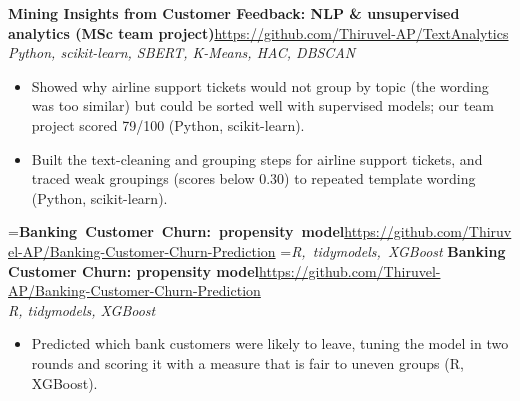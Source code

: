 \documentclass[a4paper,11pt]{article}
\newcommand{\project}[3]{%
  \textbf{#1}\hfill#3\\ {\color{muted}\small\textit{#2}}\par}
\newcommand{\gap}{\vspace{5pt}}
\begin{document}
\ifdim\wd0>\linewidth
\ifdim\wd2>\linewidth
\textbf{Mining Insights from Customer Feedback: NLP \& unsupervised analytics (MSc team project)}\\ {\color{muted}\small\textit{Python, scikit-learn, SBERT, K-Means, HAC, DBSCAN}}\\ \hspace*{\fill}{\small\url{https://github.com/Thiruvel-AP/TextAnalytics}}\par
\else
\textbf{Mining Insights from Customer Feedback: NLP \& unsupervised analytics (MSc team project)}\\ {\color{muted}\small\textit{Python, scikit-learn, SBERT, K-Means, HAC, DBSCAN}}\hfill{\small\url{https://github.com/Thiruvel-AP/TextAnalytics}}\par
\fi
\else
\project{Mining Insights from Customer Feedback: NLP \& unsupervised analytics (MSc team project)}{Python, scikit-learn, SBERT, K-Means, HAC, DBSCAN}{\url{https://github.com/Thiruvel-AP/TextAnalytics}}
\fi
\begin{itemize}
  \item Showed why airline support tickets would not group by topic (the wording was too similar) but could be sorted well with supervised models; our team project scored 79/100 (Python, scikit-learn).
  \item Built the text-cleaning and grouping steps for airline support tickets, and traced weak groupings (scores below 0.30) to repeated template wording (Python, scikit-learn).
\end{itemize}
\gap
{}
=\hbox{\textbf{Banking Customer Churn: propensity model}\hspace{1em}\url{https://github.com/Thiruvel-AP/Banking-Customer-Churn-Prediction}}%
=\hbox{{\small\textit{R, tidymodels, XGBoost}}}%
\ifdim\wd0>\linewidth
\ifdim\wd2>\linewidth
\textbf{Banking Customer Churn: propensity model}\\ {\color{muted}\small\textit{R, tidymodels, XGBoost}}\\ \hspace*{\fill}{\small\url{https://github.com/Thiruvel-AP/Banking-Customer-Churn-Prediction}}\par
\else
\textbf{Banking Customer Churn: propensity model}\\ {\color{muted}\small\textit{R, tidymodels, XGBoost}}\hfill{\small\url{https://github.com/Thiruvel-AP/Banking-Customer-Churn-Prediction}}\par
\fi
\else
\project{Banking Customer Churn: propensity model}{R, tidymodels, XGBoost}{\url{https://github.com/Thiruvel-AP/Banking-Customer-Churn-Prediction}}
\fi
\begin{itemize}
  \item Predicted which bank customers were likely to leave, tuning the model in two rounds and scoring it with a measure that is fair to uneven groups (R, XGBoost).
\end{itemize}
\end{document}
